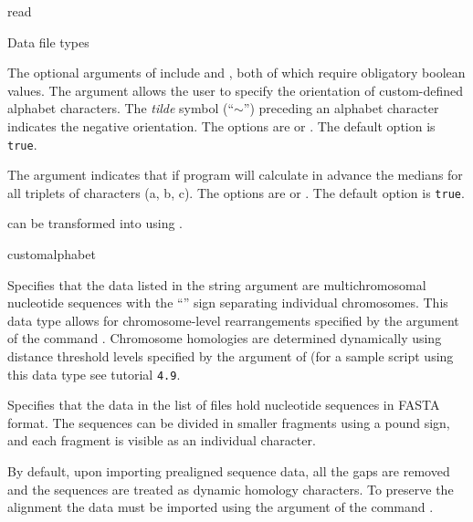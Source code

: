 \begin{command}{read}{}
\begin{arguments}
\begin{argumentgroup}{Data file types}
{	The optional arguments of  include 
	and , both of which require obligatory boolean values. The argument
	 allows the user to specify the orientation of custom-defined alphabet
	characters. The \emph{tilde} symbol (``$\sim$'') preceding an alphabet character indicates
	the negative orientation. The options are 
	or . The default option is \texttt{true}.
	
	The argument  indicates that if program will calculate in advance
	the medians for all triplets of characters (a, b, c). The options are  or
	. The default option is \texttt{true}.
	
	can be transformed into  using .}
	 {customalphabet}
        
            {Specifies that the data listed in the string argument are
            multichromosomal nucleotide sequences with the ``\atsymbol'' sign 
            separating individual chromosomes. This data type
            allows for chromosome-level rearrangements specified by
            the argument
             of the command
            . Chromosome
            homologies are determined dynamically using distance
            threshold levels specified by the argument
            of (for a sample script using this data type see tutorial \texttt{4.9}.} 
            {}
            
            {Specifies that the data in the list of files hold nucleotide
            sequences in FASTA format. The sequences can be divided in smaller
            fragments using a pound sign, and each fragment is visible as an
            individual character.} 
            {}

	\begin{statement}
            By default, upon importing prealigned sequence data, all the gaps are
             removed and the sequences are treated as dynamic homology characters.
             To preserve the alignment the data must be imported using the
              argument of the command .
          \end{statement}
        

\end{argumentgroup}
\end{arguments}
\end{command}

